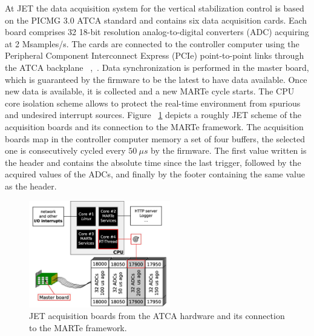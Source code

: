 At JET the data acquisition system for the vertical stabilization control is based on the PICMG 3.0 ATCA standard  and contains six data acquisition cards. Each board comprises 32 18-bit resolution analog-to-digital converters (ADC) acquiring at 2 Msamples/s. The cards are connected to the controller computer using the Peripheral Component Interconnect Express (PCIe) point-to-point links through the ATCA backplane ~\cite{Neto2010},~\cite{ATCA2006}. Data synchronization is performed in the master board, which is guaranteed by the firmware to be the latest to have data available. Once new data is available, it is collected and a new MARTe cycle starts. The CPU core isolation scheme allows to protect the real-time environment from spurious and undesired interrupt sources. Figure ~\ref{ATCa_JET} depicts a roughly JET scheme of the acquisition boards and its connection to the MARTe framework. The acquisition boards map in the controller computer memory a set of four buffers, the selected one is consecutively cycled every $50~ \mu s$  by the firmware. The first value written is the header and contains the absolute time since the last trigger, followed by the acquired  values of the ADCs, and finally by the footer containing the same value as the header. \smallskip

\begin{figure}[htbp]
	\centering
	\includegraphics[width=0.55\textwidth]{Chp2/ATCA_JET.png}
	\caption{\label{ATCa_JET}  JET acquisition boards from the ATCA hardware  and its connection to the MARTe framework.  ~\cite{Neto2010}}
	
\end{figure}



